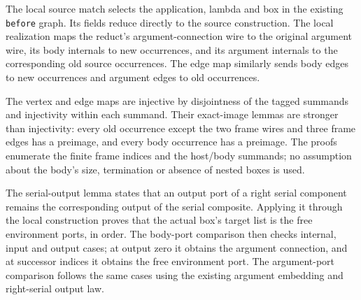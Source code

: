 The local source match selects the application, lambda and box in the
existing \texttt{before} graph. Its fields reduce directly to the source
construction. The local realization maps the reduct's argument-connection
wire to the original argument wire, its body internals to new occurrences,
and its argument internals to the corresponding old source occurrences.
The edge map similarly sends body edges to new occurrences and argument edges
to old occurrences.




The vertex and edge maps are injective by disjointness of the tagged summands
and injectivity within each summand. Their exact-image lemmas are stronger
than injectivity: every old occurrence except the two frame wires and three
frame edges has a preimage, and every body occurrence has a preimage.
The proofs enumerate the finite frame indices and the host/body summands;
no assumption about the body's size, termination or absence of nested boxes
is used.





The serial-output lemma states that an output port of a right serial
component remains the corresponding output of the serial composite. Applying
it through the local construction proves that the actual box's target list is
the free environment ports, in order. The body-port comparison then checks
internal, input and output cases; at output zero it obtains the argument
connection, and at successor indices it obtains the free environment port.
The argument-port comparison follows the same cases using the existing
argument embedding and right-serial output law.



